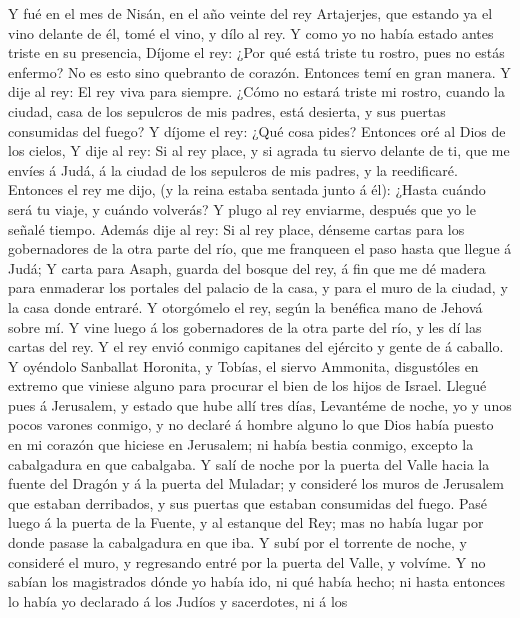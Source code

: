  Y fué en el mes de Nisán, en el año veinte del rey
Artajerjes, que estando ya el vino delante de él, tomé el vino, y dílo
al rey. Y como yo no había estado antes triste en su presencia,
 Díjome el rey: ¿Por qué está triste tu rostro, pues no
estás enfermo? No es esto sino quebranto de corazón. Entonces temí en
gran manera.  Y dije al rey: El rey viva para siempre. ¿Cómo
no estará triste mi rostro, cuando la ciudad, casa de los sepulcros de
mis padres, está desierta, y sus puertas consumidas del fuego?
 Y díjome el rey: ¿Qué cosa pides? Entonces oré al Dios de
los cielos,  Y dije al rey: Si al rey place, y si agrada tu
siervo delante de ti, que me envíes á Judá, á la ciudad de los sepulcros
de mis padres, y la reedificaré.  Entonces el rey me dijo,
(y la reina estaba sentada junto á él): ¿Hasta cuándo será tu viaje, y
cuándo volverás? Y plugo al rey enviarme, después que yo le señalé
tiempo.  Además dije al rey: Si al rey place, dénseme cartas
para los gobernadores de la otra parte del río, que me franqueen el paso
hasta que llegue á Judá;  Y carta para Asaph, guarda del
bosque del rey, á fin que me dé madera para enmaderar los portales del
palacio de la casa, y para el muro de la ciudad, y la casa donde
entraré. Y otorgómelo el rey, según la benéfica mano de Jehová sobre mí.
 Y vine luego á los gobernadores de la otra parte del río, y
les dí las cartas del rey. Y el rey envió conmigo capitanes del ejército
y gente de á caballo.  Y oyéndolo Sanballat Horonita, y
Tobías, el siervo Ammonita, disgustóles en extremo que viniese alguno
para procurar el bien de los hijos de Israel.  Llegué pues
á Jerusalem, y estado que hube allí tres días,  Levantéme
de noche, yo y unos pocos varones conmigo, y no declaré á hombre alguno
lo que Dios había puesto en mi corazón que hiciese en Jerusalem; ni
había bestia conmigo, excepto la cabalgadura en que cabalgaba.
 Y salí de noche por la puerta del Valle hacia la fuente
del Dragón y á la puerta del Muladar; y consideré los muros de Jerusalem
que estaban derribados, y sus puertas que estaban consumidas del fuego.
 Pasé luego á la puerta de la Fuente, y al estanque del
Rey; mas no había lugar por donde pasase la cabalgadura en que iba.
 Y subí por el torrente de noche, y consideré el muro, y
regresando entré por la puerta del Valle, y volvíme.  Y no
sabían los magistrados dónde yo había ido, ni qué había hecho; ni hasta
entonces lo había yo declarado á los Judíos y sacerdotes, ni á los
